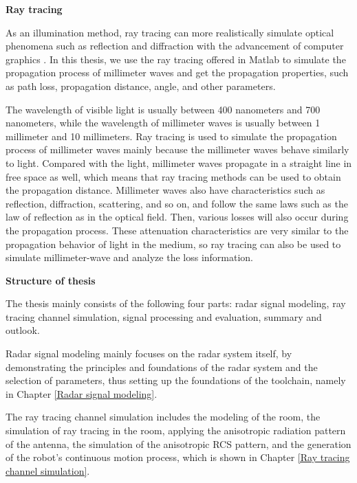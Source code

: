 \documentclass[12pt,DIV14,BCOR12mm,a4paper,footinclude=false,headinclude,parskip=half-,twoside,openright,cleardoublepage=empty,toc=index,bibliography=totoc,listof=totoc]{scrreprt}
\numberwithin{equation}{chapter}
\begin{document}
\begin{spacing}{1.5}
\textbf{\large{Ray tracing}}
\end{spacing}

As an illumination method, ray tracing can more realistically simulate optical phenomena such as reflection and diffraction with the advancement of computer graphics \cite{raytracing_introduction}. In this thesis, we use the ray tracing offered in Matlab to simulate the propagation process of millimeter waves and get the propagation properties, such as path loss, propagation distance, angle, and other parameters.

The wavelength of visible light is usually between 400 nanometers and 700 nanometers, while the wavelength of millimeter waves is usually between 1 millimeter and 10 millimeters. Ray tracing is used to simulate the propagation process of millimeter waves mainly because the millimeter waves behave similarly to light. Compared with the light, millimeter waves propagate in a straight line in free space as well, which means that ray tracing methods can be used to obtain the propagation distance. Millimeter waves also have characteristics such as reflection, diffraction, scattering, and so on, and follow the same laws such as the law of reflection as in the optical field. Then, various losses will also occur during the propagation process. These attenuation characteristics are very similar to the propagation behavior of light in the medium, so ray tracing can also be used to simulate millimeter-wave and analyze the loss information.

\begin{spacing}{1.5}
\textbf{\large{Structure of thesis}}
\end{spacing}

The thesis mainly consists of the following four parts: radar signal modeling, ray tracing channel simulation, signal processing and evaluation, summary and outlook.

Radar signal modeling mainly focuses on the radar system itself, by demonstrating the principles and foundations of the radar system and the selection of parameters, thus setting up the foundations of the toolchain, namely in Chapter \ref{Radar signal modeling}.

The ray tracing channel simulation includes the modeling of the room, the simulation of ray tracing in the room, applying the anisotropic radiation pattern of the antenna, the simulation of the anisotropic RCS pattern, and the generation of the robot's continuous motion process, which is shown in Chapter \ref{Ray tracing channel simulation}.
\end{document}
